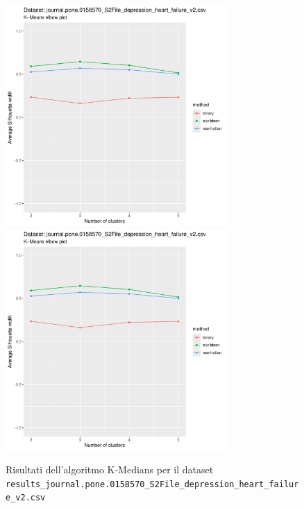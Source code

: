 \documentclass[12pt]{report}
\begin{document}
			\begin{figure}[h]
				\centering
				\includegraphics[width = 0.75\textwidth, height = 0.45\textheight, page = 3]{
					results/results_journal.pone.0158570_S2File_depression_heart_failure_v2.csv.pdf
				}
				\includegraphics[width = 0.75\textwidth, height = 0.45\textheight, page = 4]{
					results/results_journal.pone.0158570_S2File_depression_heart_failure_v2.csv.pdf
				}
				\caption{Risultati dell'algoritmo K-Medians per il dataset
				\texttt{results\_journal.pone.0158570\_S2File\_depression\_heart\_failure\_v2.csv}}
				\label{fig:kmedians1}
			\end{figure}
\end{document}
